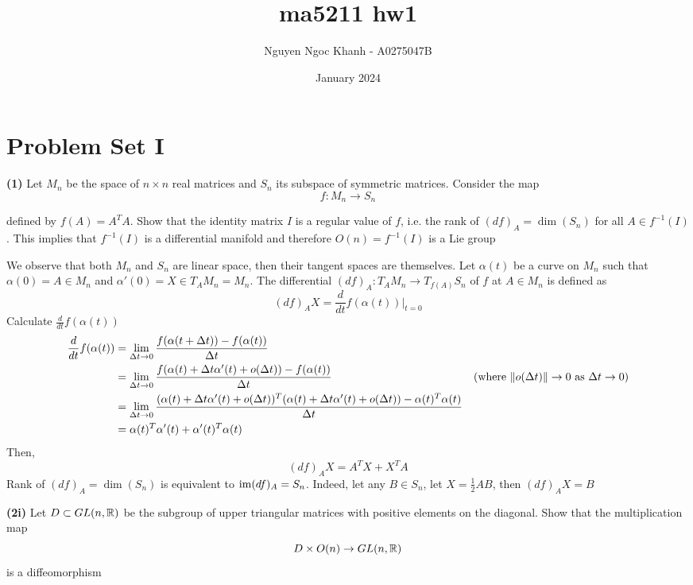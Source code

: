 \documentclass{article}
\title{ma5211 hw1}
\author{Nguyen Ngoc Khanh - A0275047B}
\date{January 2024}
\begin{document}
\maketitle

\section{Problem Set I}

\textbf{(1)} Let $M_n$ be the space of $n \times n$ real matrices and $S_n$ its subspace of symmetric matrices. Consider the map
$$
    f: M_n \to S_n
$$

defined by $f(A) = A^T A$. Show that the identity matrix $I$ is a regular value of $f$, i.e. the rank of $(df)_A = \dim(S_n)$ for all $A \in f^{-1}(I)$. This implies that $f^{-1}(I)$ is a differential manifold and therefore $O(n) = f^{-1}(I)$ is a Lie group

\begin{longproof}
    We observe that both $M_n$ and $S_n$ are linear space, then their tangent spaces are themselves. Let $\alpha(t)$ be a curve on $M_n$ such that $\alpha(0) = A \in M_n$ and $\alpha'(0) = X \in T_A M_n = M_n$. The differential $(df)_A: T_A M_n \to T_{f(A)} S_n$ of $f$ at $A \in M_n$ is defined as
    $$
        (df)_A X = \frac{d}{dt} f(\alpha(t)) |_{t=0}
    $$
    Calculate $\frac{d}{dt} f(\alpha(t))$
    \begin{align*}
        \frac{d}{dt} f(\alpha(t))
        &= \lim_{\Delta t \to 0} \frac{f(\alpha(t + \Delta t)) - f(\alpha(t))}{\Delta t} \\
        &= \lim_{\Delta t \to 0} \frac{f(\alpha(t) + \Delta t \alpha'(t) + o(\Delta t)) - f(\alpha(t))}{\Delta t} &\text{(where $\lVert o(\Delta t)\rVert \to 0$ as $\Delta t \to 0$)}\\
        &= \lim_{\Delta t \to 0} \frac{(\alpha(t) + \Delta t \alpha'(t) + o(\Delta t))^T (\alpha(t) + \Delta t \alpha'(t) + o(\Delta t)) - \alpha(t)^T \alpha(t)}{\Delta t} \\
        &= \alpha(t)^T \alpha'(t) + \alpha'(t)^T \alpha(t)
    \end{align*}
    Then,
    $$
        (df)_A X = A^T X + X^T A
    $$
    Rank of $(df)_A = \dim(S_n)$ is equivalent to $\operatorname{im} (df)_A = S_n$. Indeed, let any $B \in S_n$, let $X = \frac{1}{2}AB$, then $(df)_A X = B$
\end{longproof}

\textbf{(2i)} Let $D \subset GL(n, \mathbb{R})$ be the subgroup of upper triangular matrices with positive elements on the diagonal. Show that the multiplication map
$$
    D \times O(n) \to GL(n, \mathbb{R})
$$
is a diffeomorphism
\end{document}
